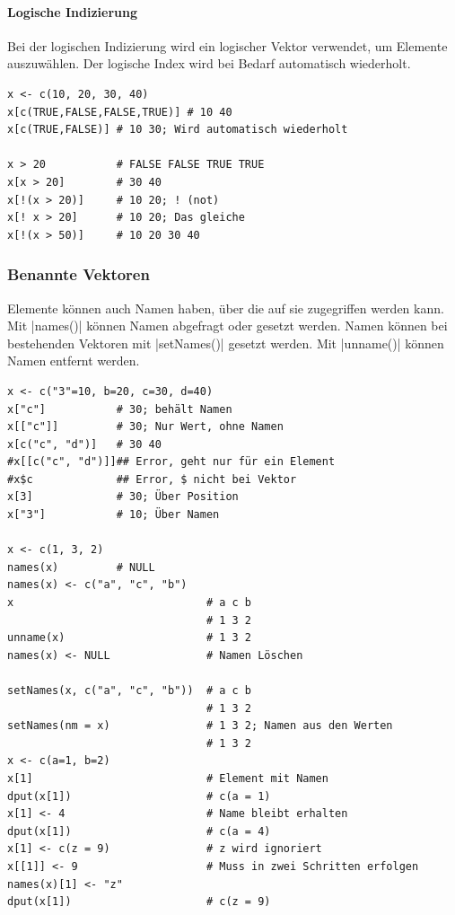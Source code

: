 \documentclass[10pt,twocolumn]{scrartcl}
\renewcommand{\lstinline}{\mycoloredinline}
\begin{document}
\paragraph{Logische Indizierung}

Bei der logischen Indizierung wird ein logischer Vektor verwendet, um Elemente
auszuwählen. Der logische Index wird bei Bedarf automatisch wiederholt.

\begin{lstlisting}
x <- c(10, 20, 30, 40)
x[c(TRUE,FALSE,FALSE,TRUE)] # 10 40
x[c(TRUE,FALSE)] # 10 30; Wird automatisch wiederholt

x > 20           # FALSE FALSE TRUE TRUE
x[x > 20]        # 30 40
x[!(x > 20)]     # 10 20; ! (not)
x[! x > 20]      # 10 20; Das gleiche
x[!(x > 50)]     # 10 20 30 40
\end{lstlisting}


\subsubsection{Benannte Vektoren}

Elemente können auch Namen haben, über die auf sie zugegriffen werden kann.
Mit \lstinline|names()| können Namen abgefragt oder gesetzt werden.
Namen können bei bestehenden Vektoren mit \lstinline|setNames()| gesetzt werden.
Mit \lstinline|unname()| können Namen entfernt werden.

\begin{lstlisting}
x <- c("3"=10, b=20, c=30, d=40)
x["c"]           # 30; behält Namen
x[["c"]]         # 30; Nur Wert, ohne Namen
x[c("c", "d")]   # 30 40
#x[[c("c", "d")]]## Error, geht nur für ein Element
#x$c             ## Error, $ nicht bei Vektor
x[3]             # 30; Über Position
x["3"]           # 10; Über Namen

x <- c(1, 3, 2)
names(x)         # NULL
names(x) <- c("a", "c", "b")
x                              # a c b
                               # 1 3 2
unname(x)                      # 1 3 2
names(x) <- NULL               # Namen Löschen

setNames(x, c("a", "c", "b"))  # a c b
                               # 1 3 2
setNames(nm = x)               # 1 3 2; Namen aus den Werten
                               # 1 3 2
x <- c(a=1, b=2)
x[1]                           # Element mit Namen
dput(x[1])                     # c(a = 1)
x[1] <- 4                      # Name bleibt erhalten
dput(x[1])                     # c(a = 4)
x[1] <- c(z = 9)               # z wird ignoriert
x[[1]] <- 9                    # Muss in zwei Schritten erfolgen
names(x)[1] <- "z"
dput(x[1])                     # c(z = 9)
\end{lstlisting}
\end{document}
